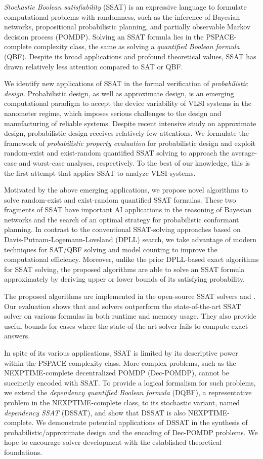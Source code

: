 \textit{Stochastic Boolean satisfiability} (SSAT) is an expressive language
to formulate computational problems with randomness,
such as the inference of Bayesian networks,
propositional probabilistic planning,
and partially observable Markov decision process (POMDP).
Solving an SSAT formula lies in the PSPACE-complete complexity class,
the same as solving a \textit{quantified Boolean formula} (QBF).
Despite its broad applications and profound theoretical values,
SSAT has drawn relatively less attention compared to SAT or QBF.

We identify new applications of SSAT in the formal verification of \textit{probabilistic design}.
Probabilistic design, as well as approximate design,
is an emerging computational paradigm to accept the device variability of VLSI systems in the nanometer regime,
which imposes serious challenges to the design and manufacturing of reliable systems.
Despite recent intensive study on approximate design,
probabilistic design receives relatively few attentions.
We formulate the framework of \textit{probabilistic property evaluation} for probabilistic design
and exploit random-exist and exist-random quantified SSAT solving
to approach the average-case and worst-case analyses, respectively.
To the best of our knowledge,
this is the first attempt that applies SSAT to analyze VLSI systems.

Motivated by the above emerging applications,
we propose novel algorithms to solve random-exist and exist-random quantified SSAT formulas.
These two fragments of SSAT have important AI applications
in the reasoning of Bayesian networks and
the search of an optimal strategy for probabilistic conformant planning.
In contrast to the conventional SSAT-solving approaches
based on Davis-Putnam-Logemann-Loveland (DPLL) search,
we take advantage of modern techniques for SAT/QBF solving and model counting
to improve the computational efficiency.
Moreover, unlike the prior DPLL-based exact algorithms for SSAT solving,
the proposed algorithms are able to solve an SSAT formula approximately
by deriving upper or lower bounds of its satisfying probability.

The proposed algorithms are implemented in the open-source SSAT solvers \ressat and \erssat.
Our evaluation shows that \ressat and \erssat solvers outperform the state-of-the-art SSAT solver
on various formulas in both runtime and memory usage.
They also provide useful bounds for cases where the state-of-the-art solver fails to compute exact answers.

In spite of its various applications,
SSAT is limited by its descriptive power within the PSPACE complexity class.
More complex problems,
such as the NEXPTIME-complete decentralized POMDP (Dec-POMDP),
cannot be succinctly encoded with SSAT.
To provide a logical formalism for such problems,
we extend the \textit{dependency quantified Boolean formula} (DQBF),
a representative problem in the NEXPTIME-complete class,
to its stochastic variant,
named \textit{dependency SSAT} (DSSAT),
and show that DSSAT is also NEXPTIME-complete.
We demonstrate potential applications of DSSAT
in the synthesis of probabilistic/approximate design
and the encoding of Dec-POMDP problems.
We hope to encourage solver development with the established theoretical foundations.

